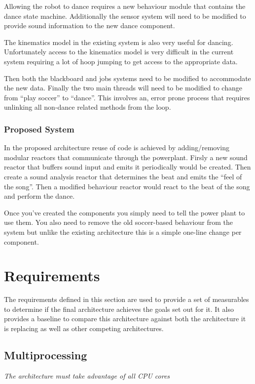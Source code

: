\documentclass[english,12pt]{scrartcl}
\newcommand{\requirement}[1]{\textit{#1}}
\begin{document}
				Allowing the robot to dance requires a new behaviour module that contains the dance state
				machine. Additionally the sensor system will need to be modified to provide sound information
				to the new dance component. 
				
				The kinematics model in the existing system is also very useful for dancing. Unfortunately access
				to the kinematics model is very difficult in the current system requiring a lot of hoop jumping to
				get access to the appropriate data. 

				Then both the blackboard and jobs systems need to be modified to accommodate the new data. 
				Finally the two main threads will need to be modified to change from ``play soccer'' to ``dance''. 
				This involves an, error prone process that requires unlinking all non-dance related methods from the loop.
				
			\subsubsection{Proposed System}
				In the proposed architecture reuse of code is achieved by adding/removing modular \glspl{reactor} that communicate through the \gls{powerplant}.
				Firsly a new sound \gls{reactor} that buffers sound input and emits it periodically would be created.
				Then create a sound analysis \gls{reactor} that determines the beat and emits the ``feel of the song''.
				Then a modified behaviour \gls{reactor} would react to the beat of the song and perform the dance.
				
				Once you've created the components you simply need to tell the power plant to use them.
				You also need to remove the old soccer-based behaviour from the system but unlike the existing architecture this is a simple one-line change per component.

	\section{Requirements}
		The requirements defined in this section are used to provide a set of measurables to determine if the final architecture achieves the goals set out for it.
		It also provides a baseline to compare this architecture against both the architecture it is replacing as well as other competing architectures.
		
		\subsection{Multiprocessing}
			\requirement{The architecture must take advantage of all CPU cores}
\end{document}
